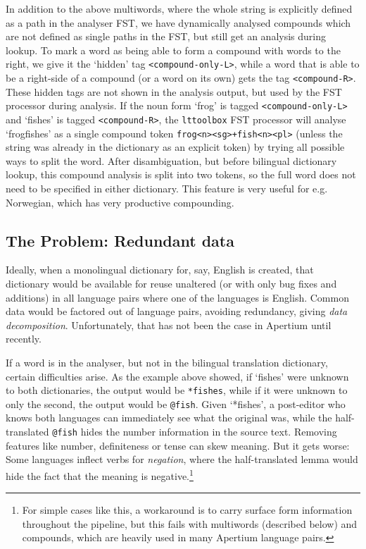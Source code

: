\documentclass[10pt, a4paper]{article}
\newcommand{\ana}[1]{\texttt{#1}}
\newcommand{\f}[1]{`#1'}
\newcommand{\tool}[1]{\texttt{#1}}
\begin{document}
In addition to the above multiwords, where the whole string is
explicitly defined as a path in the analyser FST, we have dynamically
analysed compounds which are not defined as single paths in the FST,
but still get an analysis during lookup. To mark a word as being able
to form a compound with words to the right, we give it the \f{hidden}
tag \ana{<compound-only-L>}, while a word that is able to be a
right-side of a compound (or a word on its own) gets the tag
\ana{<compound-R>}. These hidden tags are not shown in the analysis
output, but used by the FST processor during analysis. If the noun
form \f{frog} is tagged \ana{<compound-only-L>} and \f{fishes} is
tagged \ana{<compound-R>}, the \tool{lttoolbox} FST processor will
analyse \f{frogfishes} as a single compound token
\ana{frog<n><sg>+fish<n><pl>} (unless the string was already in the
dictionary as an explicit token) by trying all possible ways to split
the word. After disambiguation, but before bilingual dictionary
lookup, this compound analysis is split into two tokens, so the full
word does not need to be specified in either dictionary. This feature
is very useful for e.g. Norwegian, which has very productive
compounding.

\subsection{The Problem: Redundant data}
\label{sec:problem}

Ideally, when a monolingual dictionary for, say, English is created,
that dictionary would be available for reuse unaltered (or with only
bug fixes and additions) in all language pairs where one of the
languages is English. Common data would be factored out of language
pairs, avoiding redundancy, giving \emph{data decomposition}.
Unfortunately, that has not been the case in Apertium until recently.

If a word is in the analyser, but not in the bilingual translation
dictionary, certain difficulties arise. As the example above showed,
if \f{fishes} were unknown to both dictionaries, the output would be
\ana{*fishes}, while if it were unknown to only the second, the output
would be \ana{@fish}. Given \f{*fishes}, a post-editor who knows both
languages can immediately see what the original was, while the
half-translated \ana{@fish} hides the number information in the source
text. Removing features like number, definiteness or tense can skew
meaning.  But it gets worse: Some languages inflect verbs for
\emph{negation}, where the half-translated lemma would hide the fact
that the meaning is negative.\footnote{For simple cases like this, a
  workaround is to carry surface form information throughout the
  pipeline, but this fails with multiwords (described below) and
  compounds, which are heavily used in many Apertium language
  pairs.}
\end{document}

